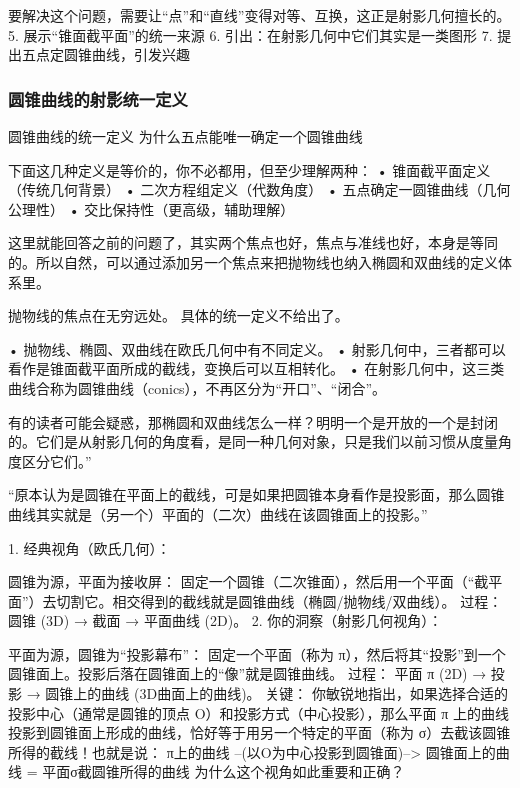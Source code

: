 要解决这个问题，需要让“点”和“直线”变得对等、互换，这正是射影几何擅长的。
	5.	展示“锥面截平面”的统一来源
	6.	引出：在射影几何中它们其实是一类图形
	7.	提出五点定圆锥曲线，引发兴趣

\subsubsection{圆锥曲线的射影统一定义}

圆锥曲线的统一定义	为什么五点能唯一确定一个圆锥曲线


下面这几种定义是等价的，你不必都用，但至少理解两种：
	•	锥面截平面定义（传统几何背景）
	•	二次方程组定义（代数角度）
	•	五点确定一圆锥曲线（几何公理性）
	•	交比保持性（更高级，辅助理解）

这里就能回答之前的问题了，其实两个焦点也好，焦点与准线也好，本身是等同的。所以自然，可以通过添加另一个焦点来把抛物线也纳入椭圆和双曲线的定义体系里。

抛物线的焦点在无穷远处。
具体的统一定义不给出了。

	•	抛物线、椭圆、双曲线在欧氏几何中有不同定义。
	•	射影几何中，三者都可以看作是锥面截平面所成的截线，变换后可以互相转化。
	•	在射影几何中，这三类曲线合称为圆锥曲线（conics），不再区分为“开口”、“闭合”。

有的读者可能会疑惑，那椭圆和双曲线怎么一样？明明一个是开放的一个是封闭的。它们是从射影几何的角度看，是同一种几何对象，只是我们以前习惯从度量角度区分它们。”

“原本认为是圆锥在平面上的截线，可是如果把圆锥本身看作是投影面，那么圆锥曲线其实就是（另一个）平面的（二次）曲线在该圆锥面上的投影。”

1. 经典视角（欧氏几何）：

圆锥为源，平面为接收屏： 固定一个圆锥（二次锥面），然后用一个平面（“截平面”）去切割它。相交得到的截线就是圆锥曲线（椭圆/抛物线/双曲线）。
过程： 圆锥 (3D) → 截面 → 平面曲线 (2D)。
2. 你的洞察（射影几何视角）：

平面为源，圆锥为“投影幕布”： 固定一个平面（称为 π），然后将其“投影”到一个圆锥面上。投影后落在圆锥面上的“像”就是圆锥曲线。
过程： 平面 π (2D) → 投影 → 圆锥上的曲线 (3D曲面上的曲线)。
关键： 你敏锐地指出，如果选择合适的投影中心（通常是圆锥的顶点 O）和投影方式（中心投影），那么平面 π 上的曲线投影到圆锥面上形成的曲线，恰好等于用另一个特定的平面（称为 σ）去截该圆锥所得的截线！也就是说：
π上的曲线 --(以O为中心投影到圆锥面)--> 圆锥面上的曲线 = 平面σ截圆锥所得的曲线
为什么这个视角如此重要和正确？

